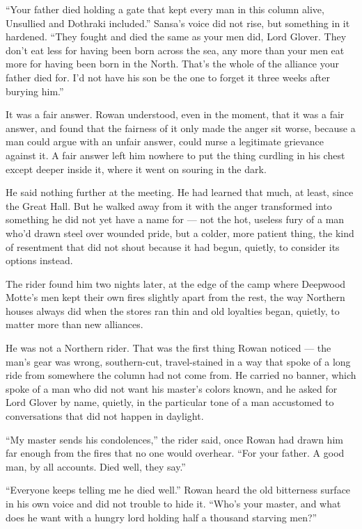 “Your father died holding a gate that kept every man in this column alive, Unsullied and Dothraki included.” Sansa’s voice did not rise, but something in it hardened. “They fought and died the same as your men did, Lord Glover. They don’t eat less for having been born across the sea, any more than your men eat more for having been born in the North. That’s the whole of the alliance your father died for. I’d not have his son be the one to forget it three weeks after burying him.”

It was a fair answer. Rowan understood, even in the moment, that it was a fair answer, and found that the fairness of it only made the anger sit worse, because a man could argue with an unfair answer, could nurse a legitimate grievance against it. A fair answer left him nowhere to put the thing curdling in his chest except deeper inside it, where it went on souring in the dark.

He said nothing further at the meeting. He had learned that much, at least, since the Great Hall. But he walked away from it with the anger transformed into something he did not yet have a name for — not the hot, useless fury of a man who’d drawn steel over wounded pride, but a colder, more patient thing, the kind of resentment that did not shout because it had begun, quietly, to consider its options instead.

\sceneBreak

The rider found him two nights later, at the edge of the camp where Deepwood Motte’s men kept their own fires slightly apart from the rest, the way Northern houses always did when the stores ran thin and old loyalties began, quietly, to matter more than new alliances.

He was not a Northern rider. That was the first thing Rowan noticed — the man’s gear was wrong, southern-cut, travel-stained in a way that spoke of a long ride from somewhere the column had not come from. He carried no banner, which spoke of a man who did not want his master’s colors known, and he asked for Lord Glover by name, quietly, in the particular tone of a man accustomed to conversations that did not happen in daylight.

“My master sends his condolences,” the rider said, once Rowan had drawn him far enough from the fires that no one would overhear. “For your father. A good man, by all accounts. Died well, they say.”

“Everyone keeps telling me he died well.” Rowan heard the old bitterness surface in his own voice and did not trouble to hide it. “Who’s your master, and what does he want with a hungry lord holding half a thousand starving men?”

